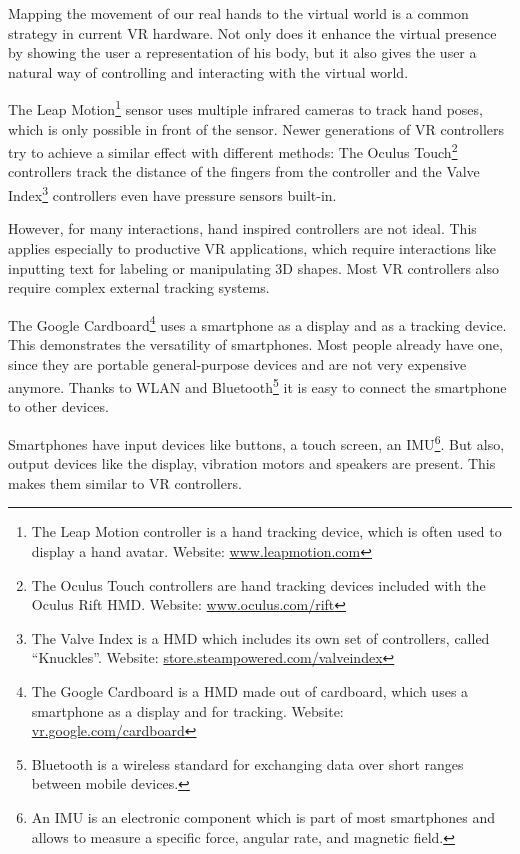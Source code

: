 Mapping the movement of our real hands to the virtual world is a common strategy in current \ac{VR} hardware. Not only does it enhance the virtual presence by showing the user a representation of his body, but it also gives the user a natural way of controlling and interacting with the virtual world.

The Leap Motion\footnote{The Leap Motion controller is a hand tracking device, which is often used to display a hand avatar. Website: \href{https://www.leapmotion.com/}{www.leapmotion.com}} sensor uses multiple infrared cameras to track hand poses, which is only possible in front of the sensor. Newer generations of \ac{VR} controllers try to achieve a similar effect with different methods: The Oculus Touch\footnote{The Oculus Touch controllers are hand tracking devices included with the Oculus Rift \ac{HMD}. Website: \href{https://www.oculus.com/rift/}{www.oculus.com/rift}} controllers track the distance of the fingers from the controller and the Valve Index\footnote{The Valve Index is a \ac{HMD} which includes its own set of controllers, called \enquote{Knuckles}. Website: \href{https://store.steampowered.com/valveindex}{store.steampowered.com/valveindex}} controllers even have pressure sensors built-in.

However, for many interactions, hand inspired controllers are not ideal. This applies especially to productive \ac{VR} applications, which require interactions like inputting text for labeling or manipulating \ac{3D} shapes. Most \ac{VR} controllers also require complex external tracking systems.

The Google Cardboard\footnote{The Google Cardboard is a \ac{HMD} made out of cardboard, which uses a smartphone as a display and for tracking. Website: \href{https://vr.google.com/cardboard/}{vr.google.com/cardboard}} uses a smartphone as a display and as a tracking device. This demonstrates the versatility of smartphones. Most people already have one, since they are portable general-purpose devices and are not very expensive anymore. Thanks to \ac{WLAN} and Bluetooth\footnote{Bluetooth is a wireless standard for exchanging data over short ranges between mobile devices.} it is easy to connect the smartphone to other devices.

Smartphones have input devices like buttons, a touch screen, an \ac{IMU}\footnote{An IMU is an electronic component which is part of most smartphones and allows to measure a specific force, angular rate, and magnetic field.}. But also, output devices like the display, vibration motors and speakers are present. This makes them similar to \ac{VR} controllers.

